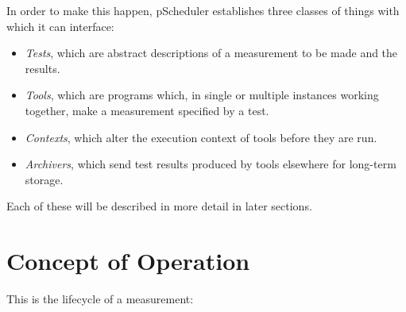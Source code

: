 \documentclass[10pt,titlepage]{article}
\begin{document}
In order to make this happen, pScheduler establishes three classes of
things with which it can interface:

\begin{itemize}
\item {\it Tests}, which are abstract descriptions of a measurement to
  be made and the results.
\item {\it Tools}, which are programs which, in single or multiple
  instances working together, make a measurement specified by a test.
\item {\it Contexts}, which alter the execution context of tools
  before they are run.
\item {\it Archivers}, which send test results produced by tools
  elsewhere for long-term storage.
\end{itemize}

Each of these will be described in more detail in later sections.

\section{Concept of Operation}


This is the lifecycle of a measurement:
\end{document}
